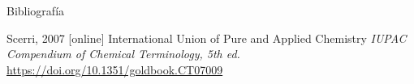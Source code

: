 \documentclass[11pt, aspectratio=169, xcolor=table]{beamer}
\begin{document}
\begin{frame}[allowframebreaks]{Bibliografía}
\begin{thebibliography}{Scerri, 2007}
    [online]
    International Union of Pure and Applied Chemistry
    \newblock \emph{IUPAC Compendium of Chemical Terminology, 5th ed.}
    \newblock \url{https://doi.org/10.1351/goldbook.CT07009}

  \end{thebibliography}
\end{frame}
\end{document}
